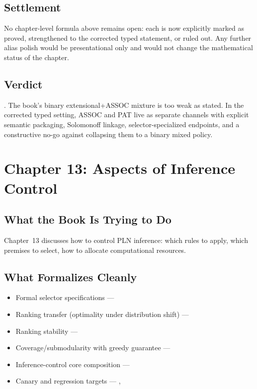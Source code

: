 \documentclass[11pt,openany]{report}
\begin{document}
\section{Settlement}

No chapter-level formula above remains open: each is now explicitly
marked as proved, strengthened to the corrected typed statement, or
ruled out.  Any further alias polish would be presentational only and
would not change the mathematical status of the chapter.

\section{Verdict}

\verdictCorrected{}.  The book's binary extensional+ASSOC mixture is too
weak as stated.  In the corrected typed setting, ASSOC and PAT live as
separate channels with explicit semantic packaging, Solomonoff linkage,
selector-specialized endpoints, and a constructive no-go against
collapsing them to a binary mixed policy.


\chapter{Chapter 13: Aspects of Inference Control}
\label{ch:review-ch13}

\section{What the Book Is Trying to Do}

Chapter~13 discusses how to control PLN inference: which rules to apply,
which premises to select, how to allocate computational resources.

\section{What Formalizes Cleanly}

\begin{itemize}
\item Formal selector specifications ---
\item Ranking transfer (optimality under distribution shift) ---
\item Ranking stability ---
\item Coverage/submodularity with greedy guarantee ---
\item Inference-control core composition ---
\item Canary and regression targets ---
  ,
\end{itemize}
\end{document}
